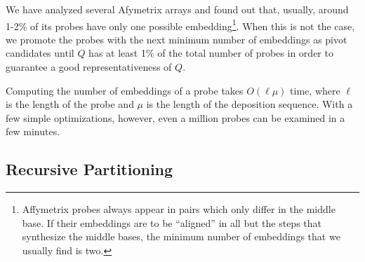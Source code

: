 \documentclass{llncs}
\begin{document}
We have analyzed several Afymetrix arrays and found out that, usually, around 1-2\% of its probes
have only one possible embedding\footnote{Affymetrix probes always appear in pairs which only
differ in the middle base. If their embeddings are to be ``aligned'' in all but the steps that
synthesize the middle bases, the minimum number of embeddings that we usually find is two.}.
When this is not the case, we promote the probes with the next minimum number of embeddings
as pivot candidates until $Q$ has at least 1\% of the total number of probes in order to
guarantee a good representativeness of $Q$.

Computing the number of embeddings of a probe takes $O(\ell \mu)$ time, where $\ell$ is the length
of the probe and $\mu$ is the length of the deposition sequence. With a few simple optimizations,
however, even a million probes can be examined in a few minutes.

\subsection{Recursive Partitioning}
\end{document}
